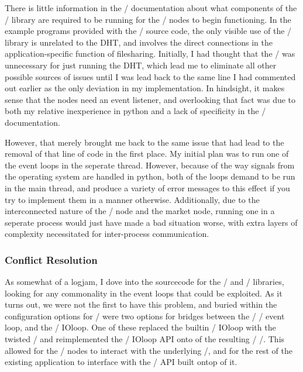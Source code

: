\documentclass[11pt,twocolumn]{article}
\begin{document}
There is little information in the \Entangled/ documentation about what components of the \Twisted/ library are required to be running for the \Entangled/ nodes to begin functioning.
In the example programs provided with the \Entangled/ source code, the only visible use of the \Twisted/ library is unrelated to the DHT, and involves the direct connections in the application-specific function of filesharing.
Initially, I had thought that the \reactor/ was unnecessary for just running the DHT, which lead me to eliminate all other possible sources of issues until I was lead back to the same line I had commented out earlier as the only deviation in my implementation.
In hindsight, it makes sense that the nodes need an event listener, and overlooking that fact was due to both my relative inexperience in python and a lack of specificity in the \Entangled/ documentation.

However, that merely brought me back to the same issue that had lead to the removal of that line of code in the first place.
My initial plan was to run one of the event loops in the seperate thread.
However, because of the way signals from the operating system are handled in python, both of the loops demand to be run in the main thread, and produce a variety of error messages to this effect if you try to implement them in a manner otherwise.
Additionally, due to the interconnected nature of the \Entangled/ node and the market node, running one in a seperate process would just have made a bad situation worse, with extra layers of complexity necessitated for inter-process communication.

\subsubsection{Conflict Resolution}
As somewhat of a logjam, I dove into the sourcecode for the \Tornado/ and \Twisted/ libraries, looking for any commonality in the event loops that could be exploited. As it turns out, we were not the first to have this problem, and buried within the configuration options for \Tornado/ were two options for bridges between the \Twisted/ \reactor/ event loop, and the \Tornado/ IOloop. One of these replaced the builtin \Tornado/ IOloop with the twisted \reactor/ and reimplemented the \Tornado/ IOloop API onto of the resulting \Twisted/ \reactor/. This allowed for the \Entangled/ nodes to interact with the underlying \reactor/, and for the rest of the existing application to interface with the \Tornado/ API built ontop of it.
\end{document}
